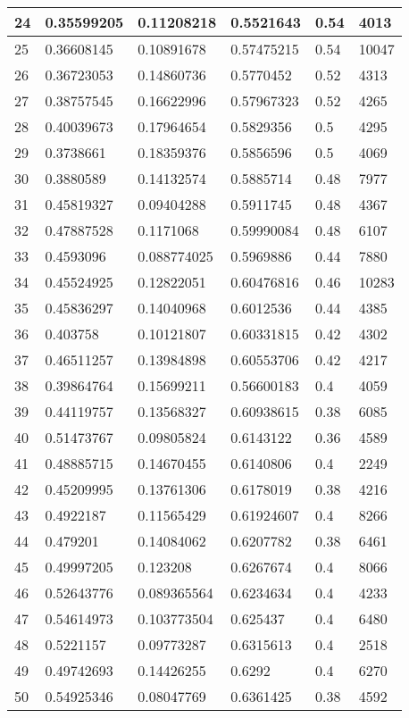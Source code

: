 \begin{longtable}{|l|l|l|l|l|l|}
24 & 0.35599205 & 0.11208218 & 0.5521643 & 0.54 & 4013 \\ \hline 
25 & 0.36608145 & 0.10891678 & 0.57475215 & 0.54 & 10047 \\ \hline 
26 & 0.36723053 & 0.14860736 & 0.5770452 & 0.52 & 4313 \\ \hline 
27 & 0.38757545 & 0.16622996 & 0.57967323 & 0.52 & 4265 \\ \hline 
28 & 0.40039673 & 0.17964654 & 0.5829356 & 0.5 & 4295 \\ \hline 
29 & 0.3738661 & 0.18359376 & 0.5856596 & 0.5 & 4069 \\ \hline 
30 & 0.3880589 & 0.14132574 & 0.5885714 & 0.48 & 7977 \\ \hline 
31 & 0.45819327 & 0.09404288 & 0.5911745 & 0.48 & 4367 \\ \hline 
32 & 0.47887528 & 0.1171068 & 0.59990084 & 0.48 & 6107 \\ \hline 
33 & 0.4593096 & 0.088774025 & 0.5969886 & 0.44 & 7880 \\ \hline 
34 & 0.45524925 & 0.12822051 & 0.60476816 & 0.46 & 10283 \\ \hline 
35 & 0.45836297 & 0.14040968 & 0.6012536 & 0.44 & 4385 \\ \hline 
36 & 0.403758 & 0.10121807 & 0.60331815 & 0.42 & 4302 \\ \hline 
37 & 0.46511257 & 0.13984898 & 0.60553706 & 0.42 & 4217 \\ \hline 
38 & 0.39864764 & 0.15699211 & 0.56600183 & 0.4 & 4059 \\ \hline 
39 & 0.44119757 & 0.13568327 & 0.60938615 & 0.38 & 6085 \\ \hline 
40 & 0.51473767 & 0.09805824 & 0.6143122 & 0.36 & 4589 \\ \hline 
41 & 0.48885715 & 0.14670455 & 0.6140806 & 0.4 & 2249 \\ \hline 
42 & 0.45209995 & 0.13761306 & 0.6178019 & 0.38 & 4216 \\ \hline 
43 & 0.4922187 & 0.11565429 & 0.61924607 & 0.4 & 8266 \\ \hline 
44 & 0.479201 & 0.14084062 & 0.6207782 & 0.38 & 6461 \\ \hline 
45 & 0.49997205 & 0.123208 & 0.6267674 & 0.4 & 8066 \\ \hline 
46 & 0.52643776 & 0.089365564 & 0.6234634 & 0.4 & 4233 \\ \hline 
47 & 0.54614973 & 0.103773504 & 0.625437 & 0.4 & 6480 \\ \hline 
48 & 0.5221157 & 0.09773287 & 0.6315613 & 0.4 & 2518 \\ \hline 
49 & 0.49742693 & 0.14426255 & 0.6292 & 0.4 & 6270 \\ \hline 
50 & 0.54925346 & 0.08047769 & 0.6361425 & 0.38 & 4592 \\ \hline 
\end{longtable}